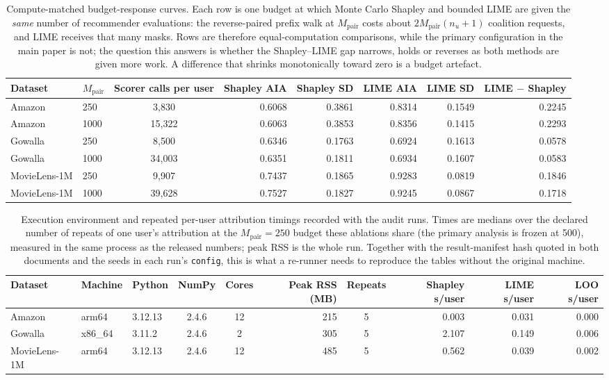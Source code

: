 \begin{table}[!htbp]\centering\scriptsize\setlength{\tabcolsep}{3pt}
\caption{Compute-matched budget-response curves. Each row is one budget at which Monte Carlo Shapley and bounded LIME are given the \emph{same} number of recommender evaluations: the reverse-paired prefix walk at $M_{\mathrm{pair}}$ costs about $2M_{\mathrm{pair}}(n_u+1)$ coalition requests, and LIME receives that many masks. Rows are therefore equal-computation comparisons, while the primary configuration in the main paper is not; the question this answers is whether the Shapley--LIME gap narrows, holds or reverses as both methods are given more work. A difference that shrinks monotonically toward zero is a budget artefact.}
\label{tab:r9-compute-matched}
\begin{tabular}{@{}llcrrrrr@{}}
\toprule
Dataset & $M_{\mathrm{pair}}$ & Scorer calls per user & Shapley AIA & Shapley SD & LIME AIA & LIME SD & LIME $-$ Shapley \\
\midrule
Amazon & 250 & 3,830 & 0.6068 & 0.3861 & 0.8314 & 0.1549 & 0.2245 \\
Amazon & 1000 & 15,322 & 0.6063 & 0.3853 & 0.8356 & 0.1415 & 0.2293 \\
Gowalla & 250 & 8,500 & 0.6346 & 0.1763 & 0.6924 & 0.1613 & 0.0578 \\
Gowalla & 1000 & 34,003 & 0.6351 & 0.1811 & 0.6934 & 0.1607 & 0.0583 \\
MovieLens-1M & 250 & 9,907 & 0.7437 & 0.1865 & 0.9283 & 0.0819 & 0.1846 \\
MovieLens-1M & 1000 & 39,628 & 0.7527 & 0.1827 & 0.9245 & 0.0867 & 0.1718 \\
\bottomrule
\end{tabular}
\end{table}


\begin{table}[!htbp]\centering\scriptsize\setlength{\tabcolsep}{3pt}
\caption{Execution environment and repeated per-user attribution timings recorded with the audit runs. Times are medians over the declared number of repeats of one user's attribution at the $M_{\mathrm{pair}}=250$ budget these ablations share (the primary analysis is frozen at 500), measured in the same process as the released numbers; peak RSS is the whole run. Together with the result-manifest hash quoted in both documents and the seeds in each run's \texttt{config}, this is what a re-runner needs to reproduce the tables without the original machine.}
\label{tab:r9-hardware}
\begin{tabular}{@{}lllccrcrrr@{}}
\toprule
Dataset & Machine & Python & NumPy & Cores & Peak RSS (MB) & Repeats & Shapley s/user & LIME s/user & LOO s/user \\
\midrule
Amazon & arm64 & 3.12.13 & 2.4.6 & 12 & 215 & 5 & 0.003 & 0.031 & 0.000 \\
Gowalla & x86_64 & 3.11.2 & 2.4.6 & 2 & 305 & 5 & 2.107 & 0.149 & 0.006 \\
MovieLens-1M & arm64 & 3.12.13 & 2.4.6 & 12 & 485 & 5 & 0.562 & 0.039 & 0.002 \\
\bottomrule
\end{tabular}
\end{table}

